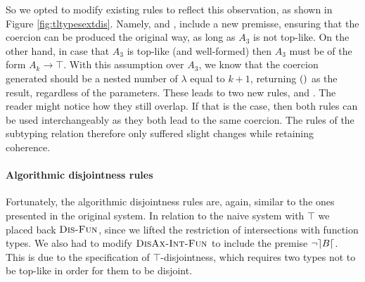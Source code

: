 So we opted to modify existing rules to reflect this observation, as shown in Figure \ref{fig:tltypesextdis}.
Namely,  and , include a new premisse, ensuring that 
the coercion can be produced the original way, as long as $A_3$ is not top-like. 
On the other hand, in case that $A_3$ is top-like (and well-formed) then $A_3$ must be of the form $A_k \to \top$. 
With this assumption over $A_3$, we know that the coercion generated should be a nested number of $\lambda$ equal to $k+1$,
returning $()$ as the result, regardless of the parameters.
These leads to two new rules,  and .
The reader might notice how they still overlap. 
If that is the case, then both rules can be used interchangeably as they both lead to the same coercion.
The rules of the subtyping relation therefore only suffered slight changes while retaining coherence.

\paragraph{Algorithmic disjointness rules}

Fortunately, the algorithmic disjointness rules are, again, similar to the ones presented in the original system.
In relation to the naive system with $\top$ we placed back $\textsc{Dis-Fun}$, since we lifted the restriction
of intersections with function types.
We also had to modify $\textsc{DisAx-Int-Fun}$ to include the premise $\neg \rceil B \lceil$.
This is due to the specification of $\top$-disjointness, which requires two types not to be top-like in order for them to be disjoint.

